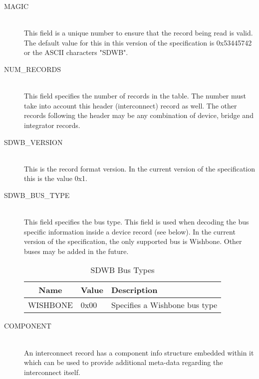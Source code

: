 \documentclass[a4paper, 12pt]{article}
\begin{document}
\begin{description}
\item[MAGIC] \hfill \\
This field is a unique number to ensure that the record being read is valid. The default
value for this in this version of the specification is 0x53445742 or the ASCII characters
"SDWB".

\item[NUM\_RECORDS] \hfill \\
This field specifies the number of records in the table. The number must take into account
this header (interconnect) record as well. The other records following the header may be
any combination of device, bridge and integrator records.

\item[SDWB\_VERSION] \hfill \\
This is the record format version. In the current version of the specification this is the
value 0x1.

\item[SDWB\_BUS\_TYPE] \hfill \\
This field specifies the bus type. This field is used when decoding the bus specific information
inside a device record (see below). In the current version of the specification, the only
supported bus is Wishbone. Other buses may be added in the future.

\begin{center}
  \begin{savenotes}
    \begin{table}[!ht]\footnotesize
      \caption{SDWB Bus Types}\label{bus_type}\centering
        \begin{tabular}{| c | l | p{5cm} |} \hline
        Name & Value & Description \\ \hline
        WISHBONE & 0x00 & Specifies a Wishbone bus type \\ \hline
        \end{tabular}
    \end{table}
  \end{savenotes}
\end{center}

\item[COMPONENT] \hfill \\
An interconnect record has a component info structure embedded within it which can be used
to provide additional meta-data regarding the interconnect itself.
\end{description}
\end{document}
